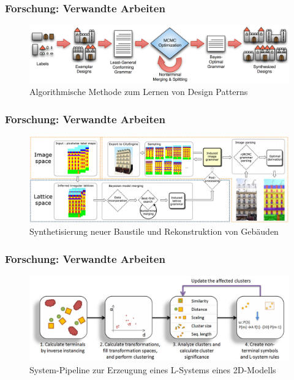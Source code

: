 \documentclass[12pt]{beamer}
\begin{document}
    \begin{frame}
        \frametitle{Forschung: Verwandte Arbeiten}

        \begin{figure}
            \centering
            \includegraphics[width=12cm]{../images/talton_2012_system.PNG}
            \caption{Algorithmische Methode zum Lernen von Design Patterns}
        \end{figure}
    \end{frame}

    \begin{frame}
        \frametitle{Forschung: Verwandte Arbeiten}

        \begin{figure}
            \centering
            \includegraphics[width=12cm]{../images/martinovic_2013_system.PNG}
            \caption{Synthetisierung neuer Baustile und Rekonstruktion von Gebäuden}
        \end{figure}
    \end{frame}

    \begin{frame}
        \frametitle{Forschung: Verwandte Arbeiten}

        \begin{figure}
            \centering
            \includegraphics[width=12cm]{../images/stava_2010_system.PNG}
            \caption{System-Pipeline zur Erzeugung eines L-Systems eines 2D-Modells}
        \end{figure}
    \end{frame}
\end{document}
